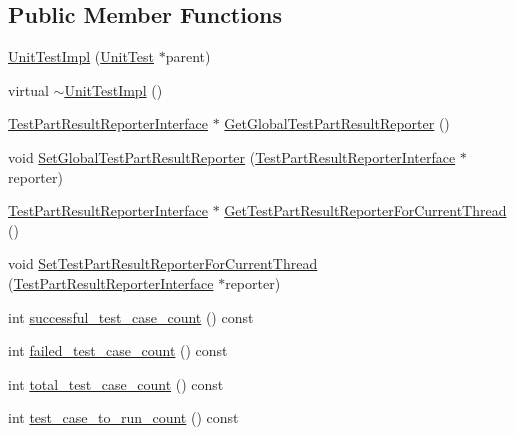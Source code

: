 \subsection*{Public Member Functions}
\begin{DoxyCompactItemize}
\item 
\hyperlink{classtesting_1_1internal_1_1UnitTestImpl_a5fb75faa88ee71f26e16473455b70839}{Unit\+Test\+Impl} (\hyperlink{classtesting_1_1UnitTest}{Unit\+Test} $\ast$parent)
\item 
virtual \hyperlink{classtesting_1_1internal_1_1UnitTestImpl_ae8bfe40adf9772237ea51299af113575}{$\sim$\+Unit\+Test\+Impl} ()
\item 
\hyperlink{classtesting_1_1TestPartResultReporterInterface}{Test\+Part\+Result\+Reporter\+Interface} $\ast$ \hyperlink{classtesting_1_1internal_1_1UnitTestImpl_a1cd291fd6751654924362164735d4b49}{Get\+Global\+Test\+Part\+Result\+Reporter} ()
\item 
void \hyperlink{classtesting_1_1internal_1_1UnitTestImpl_a892b0e25b28af5e4400cf6fac336f2d8}{Set\+Global\+Test\+Part\+Result\+Reporter} (\hyperlink{classtesting_1_1TestPartResultReporterInterface}{Test\+Part\+Result\+Reporter\+Interface} $\ast$reporter)
\item 
\hyperlink{classtesting_1_1TestPartResultReporterInterface}{Test\+Part\+Result\+Reporter\+Interface} $\ast$ \hyperlink{classtesting_1_1internal_1_1UnitTestImpl_a5fb3dd8bc839e10b62eba07790704132}{Get\+Test\+Part\+Result\+Reporter\+For\+Current\+Thread} ()
\item 
void \hyperlink{classtesting_1_1internal_1_1UnitTestImpl_a1403fc10aebcc64479c5ee980c9b4eb4}{Set\+Test\+Part\+Result\+Reporter\+For\+Current\+Thread} (\hyperlink{classtesting_1_1TestPartResultReporterInterface}{Test\+Part\+Result\+Reporter\+Interface} $\ast$reporter)
\item 
int \hyperlink{classtesting_1_1internal_1_1UnitTestImpl_a2db3a2b3fed8065dbdd768ee407bf67e}{successful\+\_\+test\+\_\+case\+\_\+count} () const
\item 
int \hyperlink{classtesting_1_1internal_1_1UnitTestImpl_af981a537231e1dad4c1f092c6fdec1ff}{failed\+\_\+test\+\_\+case\+\_\+count} () const
\item 
int \hyperlink{classtesting_1_1internal_1_1UnitTestImpl_ac1d81d6b146b2dbce460f9a0a57d4f9e}{total\+\_\+test\+\_\+case\+\_\+count} () const
\item 
int \hyperlink{classtesting_1_1internal_1_1UnitTestImpl_aff65061646c6b9857b37097423500bfe}{test\+\_\+case\+\_\+to\+\_\+run\+\_\+count} () const

\end{DoxyCompactItemize}
